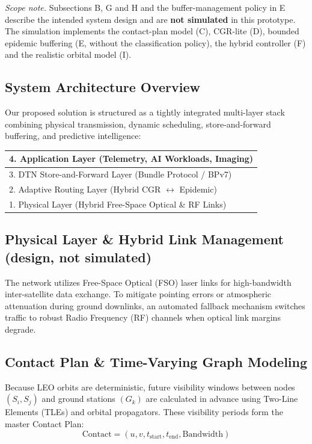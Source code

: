 \documentclass[10pt,twocolumn]{article}
\begin{document}
\emph{Scope note.} Subsections B, G and H and the buffer-management policy in E describe the intended system design and are \textbf{not simulated} in this prototype. The simulation implements the contact-plan model (C), CGR-lite (D), bounded epidemic buffering (E, without the classification policy), the hybrid controller (F) and the realistic orbital model (I).

\subsection{System Architecture Overview}
Our proposed solution is structured as a tightly integrated multi-layer stack combining physical transmission, dynamic scheduling, store-and-forward buffering, and predictive intelligence:
\begin{center}
\small
\begin{tabular}{|l|}
\hline
4. Application Layer (Telemetry, AI Workloads, Imaging) \\ \hline
3. DTN Store-and-Forward Layer (Bundle Protocol / BPv7) \\ \hline
2. Adaptive Routing Layer (Hybrid CGR $\leftrightarrow$ Epidemic) \\ \hline
1. Physical Layer (Hybrid Free-Space Optical \& RF Links) \\ \hline
\end{tabular}
\end{center}

\subsection{Physical Layer \& Hybrid Link Management (design, not simulated)}
The network utilizes Free-Space Optical (FSO) laser links for high-bandwidth inter-satellite data exchange. To mitigate pointing errors or atmospheric attenuation during ground downlinks, an automated fallback mechanism switches traffic to robust Radio Frequency (RF) channels when optical link margins degrade.

\subsection{Contact Plan \& Time-Varying Graph Modeling}
Because LEO orbits are deterministic, future visibility windows between nodes $(S_i, S_j)$ and ground stations $(G_k)$ are calculated in advance using Two-Line Elements (TLEs) and orbital propagators. These visibility periods form the master Contact Plan:
\begin{equation}
\text{Contact} = (u, v, t_{\text{start}}, t_{\text{end}}, \text{Bandwidth})
\end{equation}
\end{document}
